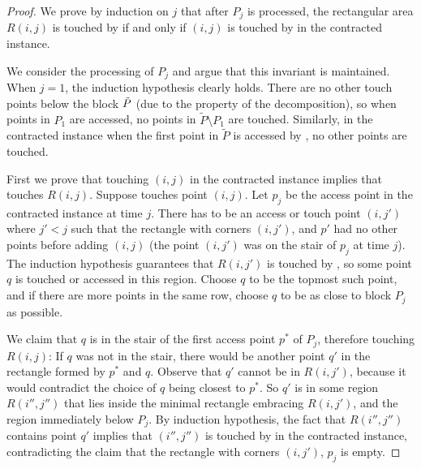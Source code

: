 \begin{proof}
We prove by induction on $j$ that after $P_j$ is processed, the rectangular area $R(i,j)$ is touched by \agreedy if and only if $(i,j)$ is touched by \greedy in the contracted instance.

We consider the processing of $P_j$ and argue that this invariant is maintained. When $j=1$, the induction hypothesis clearly holds.
There are no other touch points below the block $\tilde{P}$ (due to the property of the decomposition), so when points in $P_1$ are accessed, no points in $\tilde{P} \setminus P_1$ are touched. Similarly, in the contracted instance when the first point in $\tilde{P}$ is accessed by \greedy, no other points are touched. 

First we prove that \greedy touching $(i,j)$ in the contracted instance implies that \agreedy touches $R(i,j)$.
Suppose \greedy touches point $(i,j)$. 
Let $p_j$ be the access point in the contracted instance at time $j$. There has to be an access or touch point $(i,j')$ where $j'<j$ such that the rectangle with corners $(i,j')$, and $p'$ had no other points before adding $(i,j)$ (the point $(i,j')$ was on the stair of $p_j$ at time $j$). The induction hypothesis guarantees that $R(i,j')$ is touched by \agreedy, so some point $q$ is touched or accessed in this region.
Choose $q$ to be the topmost such point, and if there are more points in the same row, choose $q$ to be as close to block $P_j$ as possible.

We claim that $q$ is in the stair of the first access point $p^*$ of $P_j$, therefore touching $R(i,j)$: If $q$ was not in the stair, there would be another point $q'$ in the rectangle formed by $p^*$ and $q$. 
Observe that $q'$ cannot be in $R(i,j')$, because it would contradict the choice of $q$ being closest to $p^*$. So $q'$ is in some region $R(i'',j'')$ that lies inside the minimal  rectangle embracing $R(i,j')$, and the region immediately below $P_j$. By induction hypothesis, the fact that $R(i'',j'')$ contains point $q'$ implies that $(i'',j'')$ is touched by \greedy in the contracted instance, contradicting the claim that the rectangle with corners $(i,j')$, $p_j$ is empty.


\end{proof}
